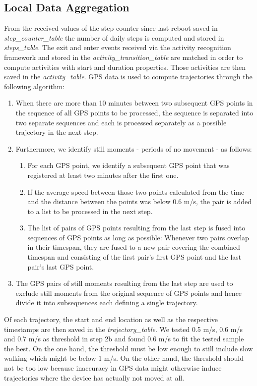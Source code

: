 \subsection{Local Data Aggregation}\label{local-data-aggregation}
From the received values of the step counter since last reboot saved in \textit{step\_counter\_table} the number of daily steps is computed and stored in \textit{steps\_table}. The exit and enter events received via the activity recognition framework and stored in the \textit{activity\_transition\_table} are matched in order to compute activities with start and duration properties. Those activities are then saved in the \textit{activity\_table}.
GPS data is used to compute trajectories through the following algorithm:
\begin{enumerate}
	\item When there are more than 10 minutes between two subsequent GPS points in the sequence of all GPS points to be processed, the sequence is separated into two separate sequences and each is processed separately as a possible trajectory in the next step.
	\item Furthermore, we identify still moments - periods of no movement - as follows:
	\begin{enumerate}
		\item For each GPS point, we identify a subsequent GPS point that was registered at least two minutes after the first one.
		\item If the average speed between those two points calculated from the time and the distance between the points was below 0.6 m/s, the pair is added to a list to be processed in the next step.
		\item The list of pairs of GPS points resulting from the last step is fused into sequences of GPS points as long as possible: Whenever two pairs overlap in their timespan, they are fused to a new pair covering the combined timespan and consisting of the first pair's first GPS point and the last pair's last GPS point.
	\end{enumerate}
	\item The GPS pairs of still moments resulting from the last step are used to exclude still moments from the original sequence of GPS points and hence divide it into subsequences each defining a single trajectory.
\end{enumerate}
Of each trajectory, the start and end location as well as the respective timestamps are then saved in the \textit{trajectory\_table}. We tested 0.5 m/s, 0.6 m/s and 0.7 m/s as threshold in step 2b and found 0.6 m/s to fit the tested sample the best. On the one hand, the threshold must be low enough to still include slow walking which might be below 1 m/s. On the other hand, the threshold should not be too low because inaccuracy in GPS data might otherwise induce trajectories where the device has actually not moved at all.

